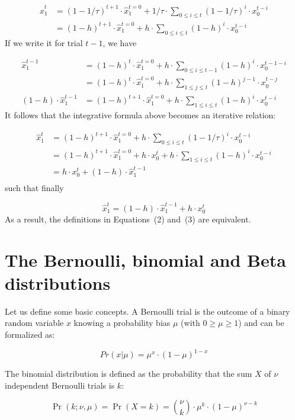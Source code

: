 \documentclass[10pt,letterpaper]{article}
\newcommand{\eq}[1]{\begin{equation*}#1\end{equation*}}
\newcommand{\eqs}[1]{\begin{align*}#1\end{align*}}
\newcommand{\seeEq}[1]{Equation~\ref{eq:#1}}
\begin{document}
\eqs{
\hat{x}_1^{t} &= (1-1/\tau)^{t+1} \cdot \hat{x}_1^{t=0} + 1/\tau \cdot \sum_{0\leq i \leq t} (1 - 1/\tau)^{i} \cdot x_0^{t-i}\\
			  &= (1-h)^{t+1} \cdot \hat{x}_1^{t=0} + h \cdot \sum_{0\leq i \leq t} (1 - h)^{i} \cdot x_0^{t-i}
}
If we write it for trial $t-1$, we have

\eqs{
\hat{x}_1^{t-1}	&= (1-h)^{t} \cdot \hat{x}_1^{t=0} + h \cdot \sum_{0\leq i \leq t-1} (1 - h)^{i} \cdot x_0^{t-1-i} \\
                &= (1-h)^{t} \cdot \hat{x}_1^{t=0} + h \cdot \sum_{1\leq j \leq t} (1 - h)^{j-1} \cdot x_0^{t-j} \\ %
(1 - h) \cdot \hat{x}_1^{t-1} &= (1-h)^{t+1} \cdot \hat{x}_1^{t=0} +  h \cdot \sum_{1\leq i \leq t} (1 - h)^{i} \cdot x_0^{t-i}
                }
It follows that the integrative formula above becomes an iterative relation:

\eqs{
\hat{x}_1^{t}	&= (1-h)^{t+1} \cdot \hat{x}_1^{t=0} + h \cdot \sum_{0\leq i \leq t} (1 - 1/\tau)^{i} \cdot x_0^{t-i} \\
				&= (1-h)^{t+1} \cdot \hat{x}_1^{t=0} + h \cdot x_0^{t} + h \cdot \sum_{1\leq i \leq t} (1 - h)^{i} \cdot x_0^{t-i} \\
				&= h \cdot x_0^{t} + (1 - h) \cdot \hat{x}_1^{t-1} \\
}
such that finally

\eq{
\hat{x}_1^{t} = (1 - h) \cdot \hat{x}_1^{t-1} + h \cdot x_0^t
}
As a result, the definitions in Equations~(2) %
and~(3)%
are equivalent.


\section{The Bernoulli, binomial and Beta distributions}
\label{app:beta}

Let us define some basic concepts. A Bernoulli trial is the outcome of a binary random variable $x$ knowing a probability bias $\mu$ (with $0 \geq \mu \geq 1$) and can be formalized as:

\eq{
Pr(x | \mu) = \mu^x \cdot (1-\mu)^{1-x}
}

The binomial distribution is defined as the probability that the sum $X$ of $\nu$ independent Bernoulli trials is $k$:

\eq{
\Pr(k;\nu,\mu) = \Pr(X = k) = {\nu\choose k} \cdot \mu^k \cdot (1-\mu)^{\nu-k}
}
\end{document}
